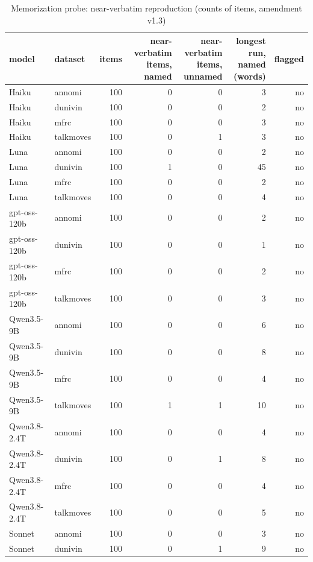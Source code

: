 \begin{table}[t]
\centering
\small
\caption{Memorization probe: near-verbatim reproduction (counts of items, amendment v1.3)}
\label{tab:tab15b_memorization_verbatim}
\begin{adjustbox}{max width=\linewidth}
\begin{tabular}{llrrrrr}
\toprule
model & dataset & items & \makecell[br]{near-verbatim \\{} items, named} & \makecell[br]{near-verbatim \\{} items, \\{} unnamed} & \makecell[br]{longest run, \\{} named \\{} (words)} & flagged \\
\midrule
Haiku & annomi & 100 & 0 & 0 & 3 & no \\
Haiku & dunivin & 100 & 0 & 0 & 2 & no \\
Haiku & mfrc & 100 & 0 & 0 & 3 & no \\
Haiku & talkmoves & 100 & 0 & 1 & 3 & no \\
Luna & annomi & 100 & 0 & 0 & 2 & no \\
Luna & dunivin & 100 & 1 & 0 & 45 & no \\
Luna & mfrc & 100 & 0 & 0 & 2 & no \\
Luna & talkmoves & 100 & 0 & 0 & 4 & no \\
gpt-oss-120b & annomi & 100 & 0 & 0 & 2 & no \\
gpt-oss-120b & dunivin & 100 & 0 & 0 & 1 & no \\
gpt-oss-120b & mfrc & 100 & 0 & 0 & 2 & no \\
gpt-oss-120b & talkmoves & 100 & 0 & 0 & 3 & no \\
Qwen3.5-9B & annomi & 100 & 0 & 0 & 6 & no \\
Qwen3.5-9B & dunivin & 100 & 0 & 0 & 8 & no \\
Qwen3.5-9B & mfrc & 100 & 0 & 0 & 4 & no \\
Qwen3.5-9B & talkmoves & 100 & 1 & 1 & 10 & no \\
Qwen3.8-2.4T & annomi & 100 & 0 & 0 & 4 & no \\
Qwen3.8-2.4T & dunivin & 100 & 0 & 1 & 8 & no \\
Qwen3.8-2.4T & mfrc & 100 & 0 & 0 & 4 & no \\
Qwen3.8-2.4T & talkmoves & 100 & 0 & 0 & 5 & no \\
Sonnet & annomi & 100 & 0 & 0 & 3 & no \\
Sonnet & dunivin & 100 & 0 & 1 & 9 & no \\

\end{tabular}
\end{adjustbox}
\end{table}
